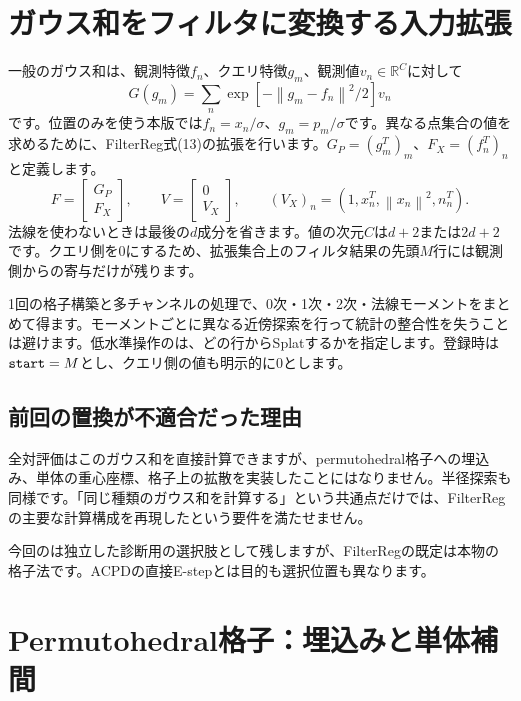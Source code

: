 \documentclass[a4paper,11pt]{article}
\newcommand{\R}{\mathbb{R}}
\newcommand{\code}[1]{\texttt{\detokenize{#1}}}
\newcommand{\norm}[1]{\left\lVert#1\right\rVert}
\numberwithin{equation}{section}
\begin{document}
\section{ガウス和をフィルタに変換する入力拡張}\label{sec:augmentation}
一般のガウス和は、観測特徴\(f_n\)、クエリ特徴\(g_m\)、観測値\(v_n\in\R^C\)に対して
\begin{equation}
 G(g_m)=\sum_n\exp[-\norm{g_m-f_n}^2/2]v_n
\end{equation}
です。位置のみを使う本版では\(f_n=x_n/\sigma\)、\(g_m=p_m/\sigma\)です。異なる点集合の値を求めるために、FilterReg式(13)の拡張を行います。\(G_P=(g_m^T)_m\)、\(F_X=(f_n^T)_n\)と定義します。\cite{fr}
\begin{equation}
 F=\begin{bmatrix}G_P\\F_X\end{bmatrix},\qquad
 V=\begin{bmatrix}0\\V_X\end{bmatrix},\qquad
 (V_X)_n=(1,x_n^T,\norm{x_n}^2,n_n^T).
\end{equation}
法線を使わないときは最後の\(d\)成分を省きます。値の次元\(C\)は\(d+2\)または\(2d+2\)です。クエリ側を0にするため、拡張集合上のフィルタ結果の先頭\(M\)行には観測側からの寄与だけが残ります。

1回の格子構築と多チャンネルの処理で、0次・1次・2次・法線モーメントをまとめて得ます。モーメントごとに異なる近傍探索を行って統計の整合性を失うことは避けます。低水準操作の\code{start}は、どの行からSplatするかを指定します。登録時は\(\code{start}=M\)とし、クエリ側の値も明示的に0とします。

\subsection{前回の置換が不適合だった理由}
全対評価はこのガウス和を直接計算できますが、permutohedral格子への埋込み、単体の重心座標、格子上の拡散を実装したことにはなりません。半径探索も同様です。「同じ種類のガウス和を計算する」という共通点だけでは、FilterRegの主要な計算構成を再現したという要件を満たせません。

今回の\code{direct}は独立した診断用の選択肢として残しますが、FilterRegの既定は本物の格子法です。ACPDの直接E-stepとは目的も選択位置も異なります。

\section{Permutohedral格子：埋込みと単体補間}\label{sec:simplex}
\end{document}
